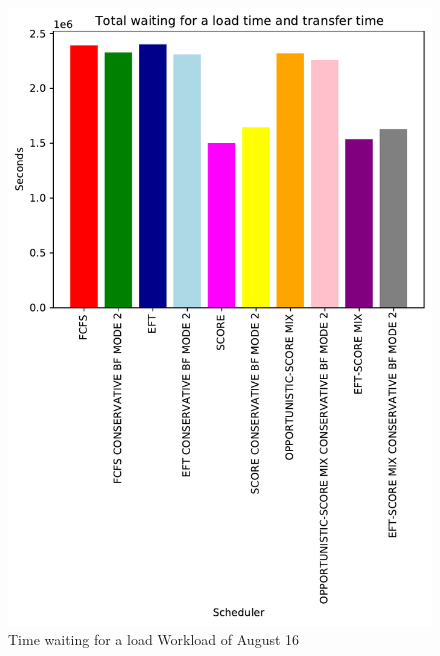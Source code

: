 \documentclass[conference,10pt]{IEEEtran}
\begin{document}
\begin{figure}\centering\includegraphics[width=1\linewidth]{../MBSS/plot/Results_FCFS_Score_Backfill_2022-08-16->2022-08-16_V10000_Total_waiting_for_a_load_time_and_transfer_time_450_128_32_256_4_1024.pdf}\caption{Time waiting for a load Workload of August 16}\end{figure}
\end{document}
